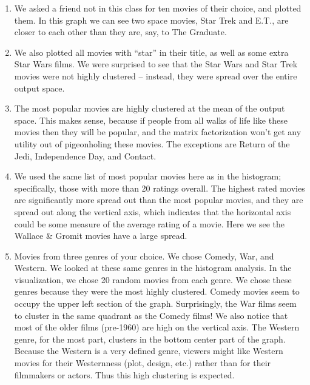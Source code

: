 \begin{enumerate}
    \item We asked a friend not in this class for ten movies of their choice, and plotted them. In this graph we can see two space movies, Star Trek and E.T., are closer to each other than they are, say, to The Graduate.
    \item We also plotted all movies with ``star'' in their title, as well as some extra Star Wars films. We were surprised to see that the Star Wars and Star Trek movies were not highly clustered -- instead, they were spread over the entire output space.
    \newpage
    \item The most popular movies are highly clustered at the mean of the output space. This makes sense, because if people from all walks of life like these movies then they will be popular, and the matrix factorization won't get any utility out of pigeonholing these movies. The exceptions are Return of the Jedi, Independence Day, and Contact.
    \newpage
    \item We used the same list of most popular movies here as in the histogram; specifically, those with more than 20 ratings overall. The highest rated movies are significantly more spread out than the most popular movies, and they are spread out along the vertical axis, which indicates that the horizontal axis could be some measure of the average rating of a movie. Here we see the Wallace \& Gromit movies have a large spread.
    \item Movies from three genres of your choice.  We chose Comedy, War, and Western. We looked at these same genres in the histogram analysis. In the visualization, we chose 20 random movies from each genre.
    We chose these genres because they were the most highly clustered. Comedy movies seem to occupy the upper left section of the graph. Surprisingly, the War films seem to cluster in the same quadrant as the Comedy films! We also notice that most of the older films (pre-1960) are high on the vertical axis.
    The Western genre, for the most part, clusters in the bottom center part of the graph. Because the Western is a very defined genre, viewers might like Western movies for their Westernness (plot, design, etc.) rather than for their filmmakers or actors. Thus this high clustering is expected.
\end{enumerate}



